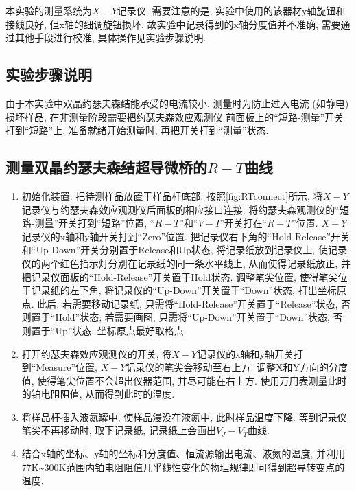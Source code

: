 \documentclass[font=default]{mpltx}
\newcommand{\note}[1]{{\color{gray}#1}}
\newcommand*\cs[1]{\texttt{\textbackslash #1}}
\begin{document}
  \par
  本实验的测量系统为$X-Y$记录仪. 需要注意的是, 实验中使用的该器材y轴旋钮和接线良好, 但x轴的细调旋钮损坏, 故实验中记录得到的x轴分度值并不准确, 需要通过其他手段进行校准, 具体操作见实验步骤说明.



\subsection{实验步骤说明}
  由于本实验中双晶约瑟夫森结能承受的电流较小, 测量时为防止过大电流 (如静电) 损坏样品, 在非测量阶段需要把约瑟夫森效应观测仪 前面板上的“短路-测量”开关打到“短路”上, 准备就绪开始测量时, 再把开关打到“测量”状态.

  \subsection{测量双晶约瑟夫森结超导微桥的$R-T$曲线}
  \begin{enumerate}
    \item 初始化装置. 把待测样品放置于样品杆底部. 按照\autoref{fig:RTconnect}所示, 将$X-Y$记录仪与约瑟夫森效应观测仪后面板的相应接口连接. 将约瑟夫森观测仪的“短路-测量”开关打到“短路”位置, “$R-T$”和“$V-I$”开关打在“$R-T$”位置. 
    $X-Y$记录仪的x轴和y轴开关打到“Zero”位置. 把记录仪右下角的“Hold-Release”开关和“Up-Down”开关分别置于Release和Up状态, 将记录纸放到记录仪上, 使记录仪的两个红色指示灯分别在记录纸的同一条水平线上, 从而使得记录纸放正, 并把记录仪面板的“Hold-Release”开关置于Hold状态. 
    调整笔尖位置, 使得笔尖位于记录纸的左下角, 将记录仪的“Up-Down”开关置于“Down”状态, 打出坐标原点. 此后, 若需要移动记录纸, 只需将“Hold-Release”开关置于“Release”状态, 否则置于“Hold”状态; 若需要画图, 只需将“Up-Down”开关置于“Down”状态, 否则置于“Up”状态. 坐标原点最好取格点.

    \item 打开约瑟夫森效应观测仪的开关,  将$X-Y$记录仪的x轴和y轴开关打到“Measure”位置, $X-Y$记录仪的笔尖会移动至右上方. 调整X和Y方向的分度值, 使得笔尖位置不会超出仪器范围, 并尽可能在右上方. 使用万用表测量此时的铂电阻阻值, 从而得到此时的温度. 
    \item 将样品杆插入液氮罐中, 使样品浸没在液氮中, 此时样品温度下降. 等到记录仪笔尖不再移动时, 取下记录纸, 记录纸上会画出$V_J-V_T$曲线. 
    \item 结合x轴的坐标、y轴的坐标和分度值、恒流源输出电流、液氮的温度, 并利用77K\textasciitilde300K范围内铂电阻阻值几乎线性变化的物理规律即可得到超导转变点的温度. 
  \end{enumerate}
\end{document}
